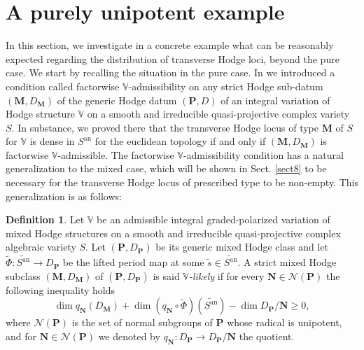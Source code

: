 \documentclass[10pt]{article}
\numberwithin{equation}{subsection}
\theoremstyle{plain}
\newtheorem{corollary}[theorem]{Corollary}
\theoremstyle{definition}
\newtheorem{definition}[theorem]{Definition}
\theoremstyle{remark}
\newcommand{\V}{\mathbb V}
\newcommand{\pp}{\mathbf P}
\newcommand{\mon}{\mathbf H}
\newcommand{\M}{\mathbf M}
\newcommand{\NN}{\mathbf N}
\newcommand{\an}{\mathrm{an}}
\newcommand{\Np}{\mathcal{N}(\pp)}
\begin{document}
\section{A purely unipotent example}\label{sect6}
In this section, we investigate in a concrete example what can be reasonably expected regarding the distribution of transverse Hodge loci, beyond the pure case. We start by recalling the situation in the pure case. In \cite{ku} we introduced a condition called factorwise $\V$-admissibility on any strict Hodge sub-datum $(\M,D_\M)$ of the generic Hodge datum $(\pp, D)$ of an integral variation of Hodge structure $\V$ on a smooth and irreducible quasi-projective complex variety $S$. In substance, we proved there that the transverse Hodge locus of type $\M$ of $S$ for $\V$ is dense in $S^\an$ for the euclidean topology if and only if $(\M,D_\M)$ is factorwise $\V$-admissible. The factorwise $\V$-admissibility condition has a natural generalization to the mixed case, which will be shown in Sect. \ref{sect8} to be necessary for the transverse Hodge locus of prescribed type to be non-empty. This generalization is as follows:
\begin{definition}\label{vlikely}
Let $\V$ be an admissible integral graded-polarized variation of mixed Hodge structures on a smooth and irreducible quasi-projective complex algebraic variety $S$. Let $(\pp, D_\pp)$ be its generic mixed Hodge class and let $\tilde{\Phi} : \widetilde{S^\an} \rightarrow D_\pp$ be the lifted period map at some $\tilde{s} \in \widetilde{S^\an}$. A strict mixed Hodge subclass $(\M,D_\M)$ of $(\pp, D_\pp)$ is said \textit{$\V$-likely} if for every $\NN \in \Np$ the following inequality holds
\begin{equation}\label{likelyn}
\dim q_\NN(D_\M) + \dim (q_\NN \circ \tilde{\Phi})(\widetilde{S^\an}) - \dim D_\pp/\NN \geqslant 0,
\end{equation}
where $\Np$ is the set of normal subgroups of $\pp$ whose radical is unipotent, and for $\NN \in \Np$ we denoted by $q_\NN : D_\pp \rightarrow D_\pp/\NN$ the quotient.
\end{definition}
\end{document}

